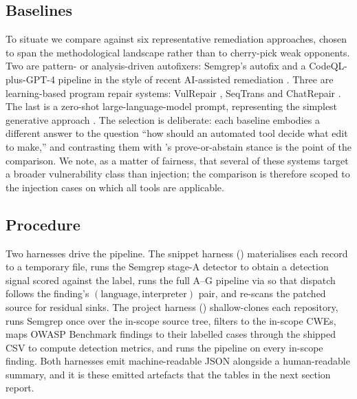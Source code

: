 \subsection{Baselines}
\label{sec:baselines}

To situate \irsam{} we compare against six representative remediation
approaches, chosen to span the methodological landscape rather than to
cherry-pick weak opponents. Two are pattern- or analysis-driven autofixers:
Semgrep's autofix and a CodeQL-plus-GPT-4 pipeline in the style of recent
AI-assisted remediation \citep{githubautofix2024}. Three are learning-based
program repair systems: VulRepair \citep{fu2022vulrepair}, SeqTrans
\citep{chi2023seqtrans} and ChatRepair \citep{xia2023chatrepair}. The last is
a zero-shot large-language-model prompt, representing the simplest
generative approach \citep{placeholder-llm-repair}. The selection is
deliberate: each baseline embodies a different answer to the question ``how
should an automated tool decide what edit to make,'' and contrasting them
with \irsam{}'s prove-or-abstain stance is the point of the comparison. We
note, as a matter of fairness, that several of these systems target a
broader vulnerability class than injection; the comparison is therefore
scoped to the injection cases on which all tools are applicable.

\subsection{Procedure}
\label{sec:procedure}

Two harnesses drive the pipeline. The snippet harness
() materialises each record to a
temporary file, runs the Semgrep stage-A detector to obtain a detection
signal scored against the label, runs the full A--G pipeline via
 so that dispatch follows the finding's
$(\text{language},\text{interpreter})$ pair, and re-scans the patched source
for residual sinks. The project harness
() shallow-clones each repository, runs
Semgrep once over the in-scope source tree, filters to the in-scope CWEs,
maps OWASP Benchmark findings to their labelled cases through the shipped
CSV to compute detection metrics, and runs the pipeline on every in-scope
finding. Both harnesses emit machine-readable JSON alongside a human-readable
summary, and it is these emitted artefacts that the tables in the next
section report.


